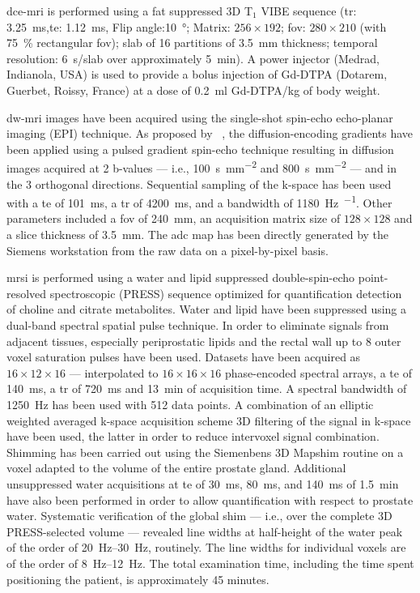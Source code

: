 \documentclass[a4paper,num-refs]{wiley-article}
\begin{document}
\ac{dce}-\ac{mri} is performed using a fat suppressed 3D T$_1$ VIBE sequence (\ac{tr}: \SI{3.25}{\ms},\ac{te}: \SI{1.12}{\ms}, Flip angle:\SI{10}{\degree}; Matrix: $256 \times 192$; \ac{fov}: $280 \times 210$ (with \SI{75}{\percent} rectangular \ac{fov}); slab of 16 partitions of \SI{3.5}{\mm} thickness; temporal resolution: \SI{6}{\s}/slab over approximately \SI{5}{\minute}).
A power injector (Medrad, Indianola, USA) is used to provide a bolus injection of Gd-DTPA (Dotarem, Guerbet, Roissy, France) at a dose of \SI{0.2}{\ml} Gd-DTPA/kg of body weight.

\ac{dw}-\ac{mri} images have been acquired using the single-shot spin-echo echo-planar imaging (EPI) technique.
As proposed by \citeauthor{stejskal1965spin}~\cite{stejskal1965spin}, the diffusion-encoding gradients have been applied using a pulsed gradient spin-echo technique resulting in diffusion images acquired at 2 b-values --- i.e., \SI{100}{\second\per\milli\meter\squared} and \SI{800}{\second\per\milli\meter\squared} --- and in the 3 orthogonal directions.
Sequential sampling of the k-space has been used with a \ac{te} of \SI{101}{\ms}, a \ac{tr} of \SI{4200}{\ms}, and a bandwidth of \SI{1180}{\hertz\per\px}.
Other parameters included a \ac{fov} of \SI{240}{\milli\metre}, an acquisition matrix size of $128 \times 128$ and a slice thickness of \SI{3.5}{\milli\metre}.
The \ac{adc} map has been directly generated by the Siemens workstation from the raw data on a pixel-by-pixel basis.

\ac{mrsi} is performed using a water and lipid suppressed double-spin-echo point-resolved spectroscopic (PRESS) sequence optimized for quantification detection of choline and citrate metabolites.
Water and lipid have been suppressed using a dual-band spectral spatial pulse technique.
In order to eliminate signals from adjacent tissues, especially periprostatic lipids and the rectal wall up to 8 outer voxel saturation pulses have been used.
Datasets have been acquired as $16 \times 12 \times 16$ --- interpolated to $16 \times 16 \times 16$ phase-encoded spectral arrays, a \ac{te} of \SI{140}{\ms}, a \ac{tr} of \SI{720}{\ms} and \SI{13}{\minute} of acquisition time.
A spectral bandwidth of \SI{1250}{\hertz} has been used with 512 data points.
A combination of an elliptic weighted averaged k-space acquisition scheme 3D filtering of the signal in k-space have been used, the latter in order to reduce intervoxel signal combination.
Shimming has been carried out using the Siemenbens 3D Mapshim routine on a voxel adapted to the volume of the entire prostate gland.
Additional unsuppressed water acquisitions at \ac{te} of \SI{30}{\ms}, \SI{80}{\ms}, and \SI{140}{\ms} of \SI{1.5}{\minute} have also been performed in order to allow quantification with respect to prostate water.
Systematic verification of the global shim --- i.e., over the complete 3D PRESS-selected volume --- revealed line widths at half-height of the water peak of the order of \SIrange{20}{30}{\hertz}, routinely.
The line widths for individual voxels are of the order of \SIrange{8}{12}{\hertz}.
The total examination time, including the time spent positioning the patient,
is approximately 45 minutes.
\end{document}

